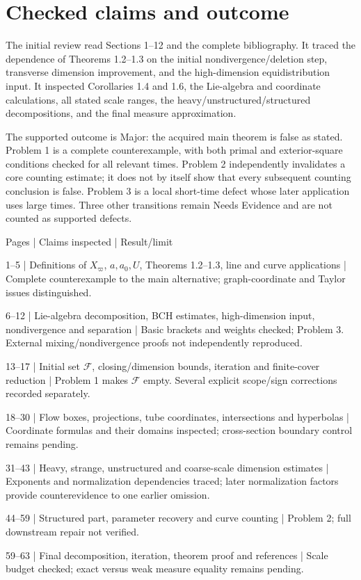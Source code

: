 \documentclass[10pt]{article}
\begin{document}
\section*{Checked claims and outcome}
The initial review read Sections 1–12 and the complete bibliography. It traced the dependence of Theorems 1.2–1.3 on the initial nondivergence/deletion step, transverse dimension improvement, and the high-dimension equidistribution input. It inspected Corollaries 1.4 and 1.6, the Lie-algebra and coordinate calculations, all stated scale ranges, the heavy/unstructured/structured decompositions, and the final measure approximation.\par
The supported outcome is Major: the acquired main theorem is false as stated. Problem 1 is a complete counterexample, with both primal and exterior-square conditions checked for all relevant times. Problem 2 independently invalidates a core counting estimate; it does not by itself show that every subsequent counting conclusion is false. Problem 3 is a local short-time defect whose later application uses large times. Three other transitions remain Needs Evidence and are not counted as supported defects.\par
Pages | Claims inspected | Result/limit\par
1–5 | Definitions of \(X_\varpi\), \(a,a_0,U\), Theorems 1.2–1.3, line and curve applications | Complete counterexample to the main alternative; graph-coordinate and Taylor issues distinguished.\par
6–12 | Lie-algebra decomposition, BCH estimates, high-dimension input, nondivergence and separation | Basic brackets and weights checked; Problem 3. External mixing/nondivergence proofs not independently reproduced.\par
13–17 | Initial set \(\mathcal F\), closing/dimension bounds, iteration and finite-cover reduction | Problem 1 makes \(\mathcal F\) empty. Several explicit scope/sign corrections recorded separately.\par
18–30 | Flow boxes, projections, tube coordinates, intersections and hyperbolas | Coordinate formulas and their domains inspected; cross-section boundary control remains pending.\par
31–43 | Heavy, strange, unstructured and coarse-scale dimension estimates | Exponents and normalization dependencies traced; later normalization factors provide counterevidence to one earlier omission.\par
44–59 | Structured part, parameter recovery and curve counting | Problem 2; full downstream repair not verified.\par
59–63 | Final decomposition, iteration, theorem proof and references | Scale budget checked; exact versus weak measure equality remains pending.\par
\end{document}

